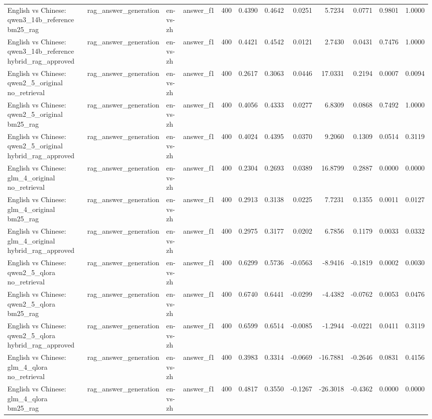 \begin{tabular}{llllrrrrrrrr}
English vs Chinese: qwen3_14b_reference bm25_rag & rag_answer_generation & en-vs-zh & answer_f1 & 400 & 0.4390 & 0.4642 & 0.0251 & 5.7234 & 0.0771 & 0.9801 & 1.0000 \\
English vs Chinese: qwen3_14b_reference hybrid_rag_approved & rag_answer_generation & en-vs-zh & answer_f1 & 400 & 0.4421 & 0.4542 & 0.0121 & 2.7430 & 0.0431 & 0.7476 & 1.0000 \\
English vs Chinese: qwen2_5_original no_retrieval & rag_answer_generation & en-vs-zh & answer_f1 & 400 & 0.2617 & 0.3063 & 0.0446 & 17.0331 & 0.2194 & 0.0007 & 0.0094 \\
English vs Chinese: qwen2_5_original bm25_rag & rag_answer_generation & en-vs-zh & answer_f1 & 400 & 0.4056 & 0.4333 & 0.0277 & 6.8309 & 0.0868 & 0.7492 & 1.0000 \\
English vs Chinese: qwen2_5_original hybrid_rag_approved & rag_answer_generation & en-vs-zh & answer_f1 & 400 & 0.4024 & 0.4395 & 0.0370 & 9.2060 & 0.1309 & 0.0514 & 0.3119 \\
English vs Chinese: glm_4_original no_retrieval & rag_answer_generation & en-vs-zh & answer_f1 & 400 & 0.2304 & 0.2693 & 0.0389 & 16.8799 & 0.2887 & 0.0000 & 0.0000 \\
English vs Chinese: glm_4_original bm25_rag & rag_answer_generation & en-vs-zh & answer_f1 & 400 & 0.2913 & 0.3138 & 0.0225 & 7.7231 & 0.1355 & 0.0011 & 0.0127 \\
English vs Chinese: glm_4_original hybrid_rag_approved & rag_answer_generation & en-vs-zh & answer_f1 & 400 & 0.2975 & 0.3177 & 0.0202 & 6.7856 & 0.1179 & 0.0033 & 0.0332 \\
English vs Chinese: qwen2_5_qlora no_retrieval & rag_answer_generation & en-vs-zh & answer_f1 & 400 & 0.6299 & 0.5736 & -0.0563 & -8.9416 & -0.1819 & 0.0002 & 0.0030 \\
English vs Chinese: qwen2_5_qlora bm25_rag & rag_answer_generation & en-vs-zh & answer_f1 & 400 & 0.6740 & 0.6441 & -0.0299 & -4.4382 & -0.0762 & 0.0053 & 0.0476 \\
English vs Chinese: qwen2_5_qlora hybrid_rag_approved & rag_answer_generation & en-vs-zh & answer_f1 & 400 & 0.6599 & 0.6514 & -0.0085 & -1.2944 & -0.0221 & 0.0411 & 0.3119 \\
English vs Chinese: glm_4_qlora no_retrieval & rag_answer_generation & en-vs-zh & answer_f1 & 400 & 0.3983 & 0.3314 & -0.0669 & -16.7881 & -0.2646 & 0.0831 & 0.4156 \\
English vs Chinese: glm_4_qlora bm25_rag & rag_answer_generation & en-vs-zh & answer_f1 & 400 & 0.4817 & 0.3550 & -0.1267 & -26.3018 & -0.4362 & 0.0000 & 0.0000 \\

\end{tabular}
